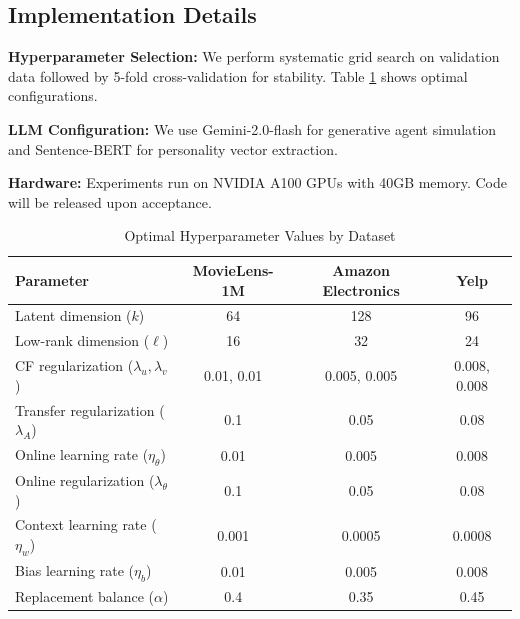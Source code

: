 \documentclass[acmsmall]{acmart}
\begin{document}
\subsection{Implementation Details}
\textbf{Hyperparameter Selection:} We perform systematic grid search on validation data followed by 5-fold cross-validation for stability. Table \ref{tab:hyperparams} shows optimal configurations.

\textbf{LLM Configuration:} We use Gemini-2.0-flash for generative agent simulation and Sentence-BERT for personality vector extraction.

\textbf{Hardware:} Experiments run on NVIDIA A100 GPUs with 40GB memory. Code will be released upon acceptance.

\begin{table}[h]
\centering
\caption{Optimal Hyperparameter Values by Dataset}
\label{tab:hyperparams}
\small
\begin{tabular}{lccc}
\toprule
\textbf{Parameter} & \textbf{MovieLens-1M} & \textbf{Amazon Electronics} & \textbf{Yelp} \\
\midrule
Latent dimension ($k$) & 64 & 128 & 96 \\
Low-rank dimension ($\ell$) & 16 & 32 & 24 \\
CF regularization ($\lambda_u, \lambda_v$) & 0.01, 0.01 & 0.005, 0.005 & 0.008, 0.008 \\
Transfer regularization ($\lambda_A$) & 0.1 & 0.05 & 0.08 \\
Online learning rate ($\eta_\theta$) & 0.01 & 0.005 & 0.008 \\
Online regularization ($\lambda_\theta$) & 0.1 & 0.05 & 0.08 \\
Context learning rate ($\eta_w$) & 0.001 & 0.0005 & 0.0008 \\
Bias learning rate ($\eta_b$) & 0.01 & 0.005 & 0.008 \\
Replacement balance ($\alpha$) & 0.4 & 0.35 & 0.45 \\
\bottomrule
\end{tabular}
\end{table}


\end{document}
